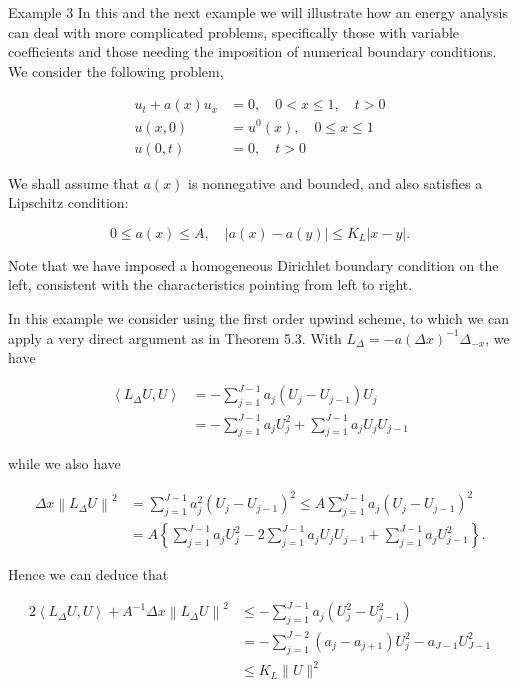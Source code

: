 \documentclass[10pt]{article}
\begin{document}
Example 3 In this and the next example we will illustrate how an energy analysis can deal with more complicated problems, specifically those with variable coefficients and those needing the imposition of numerical boundary conditions. We consider the following problem,

\[
\begin{aligned}
u_{t}+a(x) u_{x} & =0, \quad 0<x \leq 1, \quad t>0 \\
u(x, 0) & =u^{0}(x), \quad 0 \leq x \leq 1 \\
u(0, t) & =0, \quad t>0
\end{aligned}
\]

We shall assume that \(a(x)\) is nonnegative and bounded, and also satisfies a Lipschitz condition:

\[
0 \leq a(x) \leq A, \quad|a(x)-a(y)| \leq K_{L}|x-y| .
\]

Note that we have imposed a homogeneous Dirichlet boundary condition on the left, consistent with the characteristics pointing from left to right.

In this example we consider using the first order upwind scheme, to which we can apply a very direct argument as in Theorem 5.3. With \(L_{\Delta}=-a(\Delta x)^{-1} \Delta_{-x}\), we have

\[
\begin{aligned}
\left\langle L_{\Delta} U, U\right\rangle & =-\sum_{j=1}^{J-1} a_{j}\left(U_{j}-U_{j-1}\right) U_{j} \\
& =-\sum_{j=1}^{J-1} a_{j} U_{j}^{2}+\sum_{j=1}^{J-1} a_{j} U_{j} U_{j-1}
\end{aligned}
\]

while we also have

\[
\begin{aligned}
\Delta x\left\|L_{\Delta} U\right\|^{2} & =\sum_{j=1}^{J-1} a_{j}^{2}\left(U_{j}-U_{j-1}\right)^{2} \leq A \sum_{j=1}^{J-1} a_{j}\left(U_{j}-U_{j-1}\right)^{2} \\
& =A\left\{\sum_{j=1}^{J-1} a_{j} U_{j}^{2}-2 \sum_{j=1}^{J-1} a_{j} U_{j} U_{j-1}+\sum_{j=1}^{J-1} a_{j} U_{j-1}^{2}\right\} .
\end{aligned}
\]

Hence we can deduce that

\[
\begin{aligned}
2\left\langle L_{\Delta} U, U\right\rangle+A^{-1} \Delta x\left\|L_{\Delta} U\right\|^{2} & \leq-\sum_{j=1}^{J-1} a_{j}\left(U_{j}^{2}-U_{j-1}^{2}\right) \\
& =-\sum_{j=1}^{J-2}\left(a_{j}-a_{j+1}\right) U_{j}^{2}-a_{J-1} U_{J-1}^{2} \\
& \leq K_{L}\|U\|^{2}
\end{aligned}
\]
\end{document}
